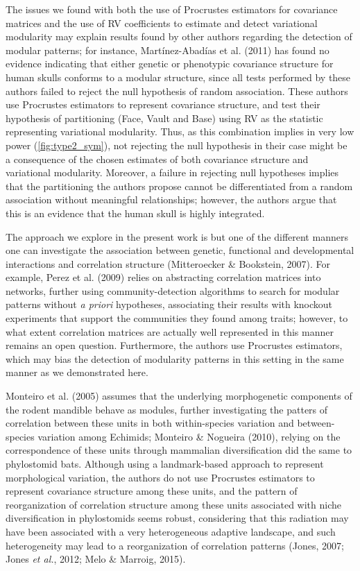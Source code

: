 \documentclass[12pt,]{article}
\begin{document}
The issues we found with both the use of Procrustes estimators for
covariance matrices and the use of RV coefficients to estimate and
detect variational modularity may explain results found by other authors
regarding the detection of modular patterns; for instance,
Martínez-Abadías et al. (2011) has found no evidence indicating that
either genetic or phenotypic covariance structure for human skulls
conforms to a modular structure, since all tests performed by these
authors failed to reject the null hypothesis of random association.
These authors use Procrustes estimators to represent covariance
structure, and test their hypothesis of partitioning (Face, Vault and
Base) using RV as the statistic representing variational modularity.
Thus, as this combination implies in very low power
(\autoref{fig:type2_sym}), not rejecting the null hypothesis in their
case might be a consequence of the chosen estimates of both covariance
structure and variational modularity. Moreover, a failure in rejecting
null hypotheses implies that the partitioning the authors propose cannot
be differentiated from a random association without meaningful
relationships; however, the authors argue that this is an evidence that
the human skull is highly integrated.

The approach we explore in the present work is but one of the different
manners one can investigate the association between genetic, functional
and developmental interactions and correlation structure (Mitteroecker
\& Bookstein, 2007). For example, Perez et al. (2009) relies on
abstracting correlation matrices into networks, further using
community-detection algorithms to search for modular patterns without
\emph{a priori} hypotheses, associating their results with knockout
experiments that support the communities they found among traits;
however, to what extent correlation matrices are actually well
represented in this manner remains an open question. Furthermore, the
authors use Procrustes estimators, which may bias the detection of
modularity patterns in this setting in the same manner as we
demonstrated here.

Monteiro et al. (2005) assumes that the underlying morphogenetic
components of the rodent mandible behave as modules, further
investigating the patters of correlation between these units in both
within-species variation and between-species variation among Echimids;
Monteiro \& Nogueira (2010), relying on the correspondence of these
units through mammalian diversification did the same to phylostomid
bats. Although using a landmark-based approach to represent
morphological variation, the authors do not use Procrustes estimators to
represent covariance structure among these units, and the pattern of
reorganization of correlation structure among these units associated
with niche diversification in phylostomids seems robust, considering
that this radiation may have been associated with a very heterogeneous
adaptive landscape, and such heterogeneity may lead to a reorganization
of correlation patterns (Jones, 2007; Jones \emph{et al.}, 2012; Melo \&
Marroig, 2015).
\end{document}
